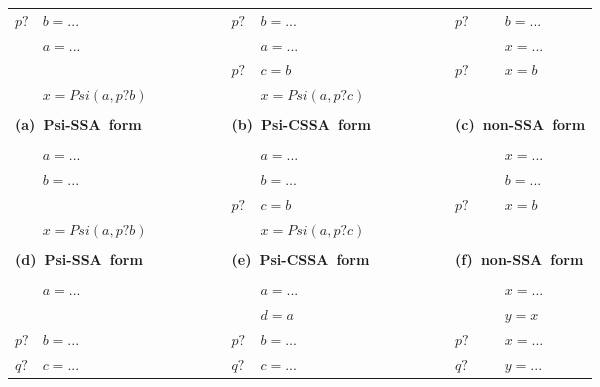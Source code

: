 \begin{figure*}
\begin{center}
\footnotesize
\begin{tabular}{llllllll}
${p?}$  & ${b = ...}$ & \ \ \ \ \ \ \ \  & ${p?}$ & ${b = ...}$ & \ \ \ \ \ \ \ \  & ${p?}$ & ${b = ...}$ \\
            & ${a = ...}$ & \ \ \ \ \ \ \ \  &            & ${a = ...}$ & \ \ \ \ \ \ \ \  &            & ${x = ...}$ \\
            &                 & \ \ \ \ \ \ \ \  & ${p?}$ & ${c = b}$   & \ \ \ \ \ \ \ \  & ${p?}$ & ${x = b}$ \\
            & ${x = Psi(a,p?b)}$ & \ \ \ \ \ \ \ \  &     & ${x = Psi(a,p?c)}$  & \ \ \ \ \ \ \ \ &     & \\
\\
\multicolumn{2}{l}{\bf (a)\ Psi-SSA\ form} & \ \ \ \ \ \ \ \  &\multicolumn{2}{l}{\bf (b)\ Psi-CSSA\ form} & \ \ \ \ \ \ \ \  &\multicolumn{2}{l}{\bf (c)\ non-SSA\ form} \\
\\
            & ${a = ...}$ & \ \ \ \ \ \ \ \  &            & ${a = ...}$ & \ \ \ \ \ \ \ \  &            & ${x = ...}$ \\
            & ${b = ...}$ & \ \ \ \ \ \ \ \  &            & ${b = ...}$ & \ \ \ \ \ \ \ \  &            & ${b = ...}$ \\
            &                 & \ \ \ \ \ \ \ \  & ${p?}$ & ${c = b}$   & \ \ \ \ \ \ \ \  & ${p?}$ & ${x = b}$ \\
            & ${x = Psi(a,p?b)}$ & \ \ \ \ \ \ \ \  &     & ${x = Psi(a,p?c)}$  & \ \ \ \ \ \ \ \ &     & \\
\\
\multicolumn{2}{l}{\bf (d)\ Psi-SSA\ form} & \ \ \ \ \ \ \ \  &\multicolumn{2}{l}{\bf (e)\ Psi-CSSA\ form} & \ \ \ \ \ \ \ \  &\multicolumn{2}{l}{\bf (f)\ non-SSA\ form} \\
\\
            & ${a = ...}$ & \ \ \ \ \ \ \ \  &            & ${a = ...}$ & \ \ \ \ \ \ \ \  &            & ${x = ...}$ \\
            &                 & \ \ \ \ \ \ \ \  &            & ${d = a}$ & \ \ \ \ \ \ \ \  &            & ${y = x}$ \\
${p?}$  & ${b = ...}$ & \ \ \ \ \ \ \ \  & ${p?}$ & ${b = ...}$ & \ \ \ \ \ \ \ \  & ${p?}$ & ${x = ...}$ \\
${q?}$  & ${c = ...}$ & \ \ \ \ \ \ \ \  & ${q?}$ & ${c = ...}$ & \ \ \ \ \ \ \ \  & ${q?}$ & ${y = ...}$ \\

\end{tabular}
\end{center}
\end{figure*}
